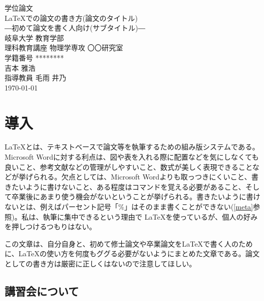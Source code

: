 \documentclass[a4j,openany,11px]{jsbook}
\begin{document}
\begin{titlepage}
\centering
\vspace*{50truept}
{\huge 学位論文}\\
\vspace{100truept}
{\huge \LaTeX での論文の書き方(論文のタイトル)}\\ %
\vspace{10truept}
{\LARGE ―初めて論文を書く人向け(サブタイトル)―}\\ %
\vspace{140truept}
{\LARGE 岐阜大学 教育学部}\\ %
\vspace{10truept}
{\LARGE 理科教育講座 物理学専攻 〇〇研究室}\\ %
\vspace{20truept}
{\LARGE 学籍番号 ********}\\ %
\vspace{20truept}
{\LARGE 吉本 雅浩}\\ %
\vspace{50truept}
{\LARGE 指導教員 毛雨 井乃}\\
\vspace{50truept}
{\LARGE \today} %
\end{titlepage}

\thispagestyle{empty} %
\tableofcontents %
\chapter{導入}

\LaTeX とは、テキストベースで論文等を執筆するための組み版システムである。Microsoft Wordに対する利点は、図や表を入れる際に配置などを気にしなくても良いこと、参考文献などの管理がしやすいこと、数式が美しく表現できることなどが挙げられる。欠点としては、Microsoft Wordよりも取っつきにくいこと、書きたいように書けないこと、ある程度はコマンドを覚える必要があること、そして卒業後にあまり使う機会がないということが挙げられる。書きたいように書けないとは、例えばパーセント記号「\%」はそのまま書くことができない(\ref{meta}参照)。私は、執筆に集中できるという理由で \LaTeX を使っているが、個人の好みを押しつけるつもりはない。

この文章は、自分自身と、初めて修士論文や卒業論文を\LaTeX で書く人のために、\LaTeX の使い方を何度もググる必要がないようにまとめた文章である。論文としての書き方は厳密に正しくはないので注意してほしい。

\section{講習会について}
\end{document}
